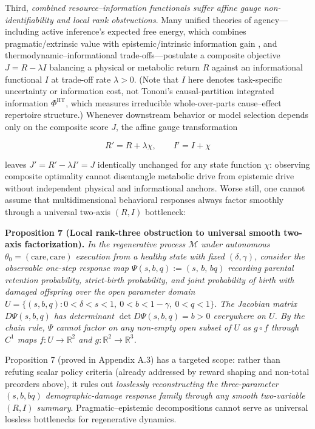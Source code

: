 \documentclass[11pt,a4paper]{article}
\begin{document}
Third, \emph{combined resource--information functionals suffer affine
gauge non-identifiability and local rank obstructions}. Many unified
theories of agency---including active inference's expected free energy,
which combines pragmatic/extrinsic value with epistemic/intrinsic
information gain \citep{parrPezzuloFriston2022}, and
thermodynamic--informational trade-offs---postulate a composite
objective \(J = R - \lambda I\) balancing a physical or metabolic return
\(R\) against an informational functional \(I\) at trade-off rate
\(\lambda > 0\). (Note that \(I\) here denotes task-specific uncertainty
or information cost, not Tononi's \citeyearpar{tononi2004}
causal-partition integrated information \(\Phi^{\mathrm{IIT}}\), which
measures irreducible whole-over-parts cause--effect repertoire
structure.) Whenever downstream behavior or model selection depends only
on the composite score \(J\), the affine gauge transformation

\[R' = R + \lambda \chi, \qquad I' = I + \chi\]

leaves \(J' = R' - \lambda I' = J\) identically unchanged for any state
function \(\chi\): observing composite optimality cannot disentangle
metabolic drive from epistemic drive without independent physical and
informational anchors. Worse still, one cannot assume that
multidimensional behavioral responses always factor smoothly through a
universal two-axis \((R, I)\) bottleneck:

\textbf{Proposition 7 (Local rank-three obstruction to universal smooth
two-axis factorization).} \emph{In the regenerative process
\(\mathcal{M}\) under autonomous
\(\theta_0 = (\mathrm{care},\mathrm{care})\) execution from a healthy
state with fixed \((\delta, \gamma)\), consider the observable one-step
response map \(\Psi(s, b, q) := (s,\, b,\, bq)\) recording parental
retention probability, strict-birth probability, and joint probability
of birth with damaged offspring over the open parameter domain
\(U = \{(s,b,q) : 0 < \delta < s < 1,\ 0 < b < 1-\gamma,\ 0 < q < 1\}\).
The Jacobian matrix \(D\Psi(s,b,q)\) has determinant
\(\det D\Psi(s,b,q) = b > 0\) everywhere on \(U\). By the chain rule,
\(\Psi\) cannot factor on any non-empty open subset of \(U\) as
\(g \circ f\) through \(C^1\) maps \(f: U \to \mathbb{R}^2\) and
\(g: \mathbb{R}^2 \to \mathbb{R}^3\).}

Proposition 7 (proved in Appendix A.3) has a targeted scope: rather than
refuting scalar policy criteria (already addressed by reward shaping and
non-total preorders above), it rules out \emph{losslessly reconstructing
the three-parameter \((s, b, bq)\) demographic-damage response family
through any smooth two-variable \((R, I)\) summary}.
Pragmatic--epistemic decompositions cannot serve as universal lossless
bottlenecks for regenerative dynamics.
\end{document}
